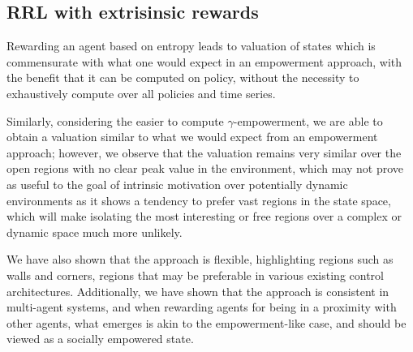 \documentclass{article}
\begin{document}


\subsection{RRL with extrisinsic rewards}
Rewarding an agent based on entropy leads to valuation of states which is commensurate with what one would expect in an empowerment approach, with the benefit that it can be computed on policy, without the necessity to exhaustively compute over all policies and time series.

Similarly, considering the easier to compute $\gamma$-empowerment, we are able to obtain a valuation similar to what we would expect from an empowerment approach; however, we observe that the valuation remains very similar over the open regions with no clear peak value in the environment, which may not prove as useful to the goal of intrinsic motivation over potentially dynamic environments as it shows a tendency to prefer vast regions in the state space, which will make isolating the most interesting or free regions over a complex or dynamic space much more unlikely.

We have also shown that the approach is flexible, highlighting regions such as walls and corners, regions that may be preferable in various existing control architectures. Additionally, we have shown that the approach is consistent in multi-agent systems, and when rewarding agents for being in a proximity with other agents, what emerges is akin to the empowerment-like case, and should be viewed as a socially empowered state.
\end{document}
